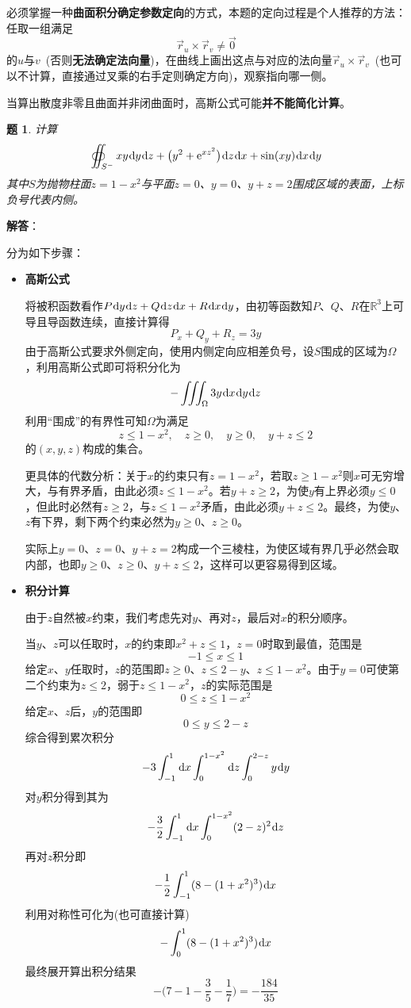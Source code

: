\documentclass[a4paper,UTF8,fontset=windows,AutoFakeBold]{ctexart}
\newcommand*{\dr}{\hspace{0.07em}\mathrm{d}}
\newcommand*{\er}{\mathrm{e}}
\newcommand*{\rb}{\mathbb{R}}
\newcommand*{\rv}{\vec{r}}
\newcommand*{\note}{\noindent *}
\theoremstyle{ex}
\newtheorem{exercise}{题}
\newcommand{\sol}[1]{{\vspace{5pt}\kaishu\noindent\textbf{解答}：\vspace{-3pt}
\begin{compactitem}
    \item[] #1
\end{compactitem}
}}
\begin{document}
\note 必须掌握一种\textbf{曲面积分确定参数定向}的方式，本题的定向过程是个人推荐的方法：任取一组满足
$$\rv_u\times\rv_v\ne\vec{0}$$
的$u$与$v$\ (否则\textbf{无法确定法向量})，在曲线上画出这点与对应的法向量$\rv_u\times\rv_v$\ (也可以不计算，直接通过叉乘的右手定则确定方向)，观察指向哪一侧。

\note 当算出散度非零且曲面并非闭曲面时，高斯公式可能\textbf{并不能简化计算}。

\begin{framed}
\begin{exercise}
    计算
    $$\oiint_{S^-}xy\dr y\dr z+\big(y^2+\er^{xz^2}\big)\dr z\dr x+\sin(xy)\dr x\dr y$$
    其中$S$为抛物柱面$z=1-x^2$与平面$z=0$、$y=0$、$y+z=2$围成区域的表面，上标负号代表内侧。
\end{exercise}
\sol{
    分为如下步骤：
    \begin{itemize}
        \item \textbf{高斯公式}
        
        将被积函数看作$P\dr y\dr z+Q\dr z\dr x+R\dr x\dr y$，由初等函数知$P$、$Q$、$R$在$\rb^3$上可导且导函数连续，直接计算得
        $$P_x+Q_y+R_z=3y$$
        由于高斯公式要求外侧定向，使用内侧定向应相差负号，设$S$围成的区域为$\Omega$，利用高斯公式即可将积分化为
        $$-\iiint_\Omega3y\dr x\dr y\dr z$$
        利用``围成''的有界性可知$\Omega$为满足
        $$z\le1-x^2,\quad z\ge0,\quad y\ge0,\quad y+z\le2$$
        的$(x,y,z)$构成的集合。

        \note 更具体的代数分析：关于$x$的约束只有$z=1-x^2$，若取$z\ge1-x^2$则$x$可无穷增大，与有界矛盾，由此必须$z\le1-x^2$。若$y+z\ge2$，为使$y$有上界必须$y\le0$，但此时必然有$z\ge2$，与$z\le1-x^2$矛盾，由此必须$y+z\le2$。最终，为使$y$、$z$有下界，剩下两个约束必然为$y\ge0$、$z\ge0$。

        \note 实际上$y=0$、$z=0$、$y+z=2$构成一个三棱柱，为使区域有界几乎必然会取内部，也即$y\ge0$、$z\ge0$、$y+z\le2$，这样可以更容易得到区域。

        \item \textbf{积分计算}
        
        由于$z$自然被$x$约束，我们考虑先对$y$、再对$z$，最后对$x$的积分顺序。

        当$y$、$z$可以任取时，$x$的约束即$x^2+z\le1$，$z=0$时取到最值，范围是
        $$-1\le x\le1$$
        给定$x$、$y$任取时，$z$的范围即$z\ge0$、$z\le2-y$、$z\le1-x^2$。由于$y=0$可使第二个约束为$z\le2$，弱于$z\le1-x^2$，$z$的实际范围是
        $$0\le z\le1-x^2$$
        给定$x$、$z$后，$y$的范围即
        $$0\le y\le 2-z$$
        综合得到累次积分
        $$-3\int_{-1}^1\dr x\int_0^{1-x^2}\dr z\int_0^{2-z}y\dr y$$
        对$y$积分得到其为
        $$-\frac{3}{2}\int_{-1}^1\dr x\int_0^{1-x^2}(2-z)^2\dr z$$
        再对$z$积分即
        $$-\frac{1}{2}\int_{-1}^1(8-(1+x^2)^3)\dr x$$
        利用对称性可化为(也可直接计算)
        $$-\int_0^1(8-(1+x^2)^3)\dr x$$
        最终展开算出积分结果
        $$-\bigg(7-1-\frac{3}{5}-\frac{1}{7}\bigg)=-\frac{184}{35}$$


\end{itemize}}
\end{framed}
\end{document}
